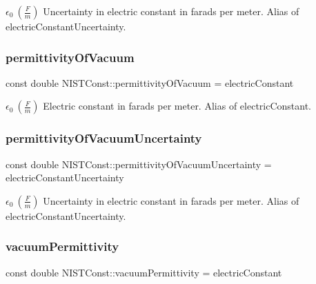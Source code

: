 $\epsilon_0 \ (\frac{F}{m})$ Uncertainty in electric constant in farads per meter. Alias of electric\+Constant\+Uncertainty. \mbox{\label{group___electric_constant_ga81378e87b977f5b3403002e187d3d22c}} 
\subsubsection{\texorpdfstring{permittivity\+Of\+Vacuum}{permittivityOfVacuum}}
{\footnotesize\ttfamily const double N\+I\+S\+T\+Const\+::permittivity\+Of\+Vacuum = electric\+Constant}

$\epsilon_0 \ (\frac{F}{m})$ Electric constant in farads per meter. Alias of electric\+Constant. \mbox{\label{group___electric_constant_ga4f15fd528291e6284d5fc3ad58c5a97a}} 
\subsubsection{\texorpdfstring{permittivity\+Of\+Vacuum\+Uncertainty}{permittivityOfVacuumUncertainty}}
{\footnotesize\ttfamily const double N\+I\+S\+T\+Const\+::permittivity\+Of\+Vacuum\+Uncertainty = electric\+Constant\+Uncertainty}

$\epsilon_0 \ (\frac{F}{m})$ Uncertainty in electric constant in farads per meter. Alias of electric\+Constant\+Uncertainty. \mbox{\label{group___electric_constant_ga46294f940b4149602e7bef336431c7dd}} 
\subsubsection{\texorpdfstring{vacuum\+Permittivity}{vacuumPermittivity}}
{\footnotesize\ttfamily const double N\+I\+S\+T\+Const\+::vacuum\+Permittivity = electric\+Constant}

